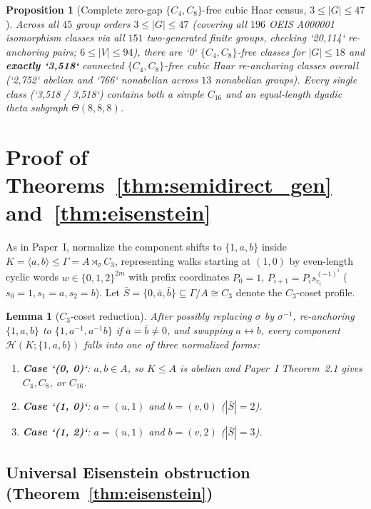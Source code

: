 \documentclass[11pt]{amsart}
\newtheorem{lemma}[theorem]{Lemma}
\newtheorem{proposition}[theorem]{Proposition}
\theoremstyle{definition}
\theoremstyle{remark}
\newcommand{\Haar}{\mathcal{H}}
\begin{document}
\begin{proposition}[Complete zero-gap $\{C_4, C_8\}$-free cubic Haar census, $3 \le |G| \le 47$]\label{prop:census}
Across all $45$ group orders $3 \le |G| \le 47$ (covering all $196$ OEIS A000001 isomorphism classes via all $151$ two-generated finite groups, checking `20,114` re-anchoring pairs; $6 \le |V| \le 94$), there are `0` $\{C_4, C_8\}$-free classes for $|G| \le 18$ and \textbf{exactly `3,518`} connected $\{C_4, C_8\}$-free cubic Haar re-anchoring classes overall (`2,752` abelian and `766` nonabelian across $13$ nonabelian groups). Every single class (`3,518 / 3,518`) contains both a simple $C_{16}$ and an equal-length dyadic theta subgraph $\Theta(8, 8, 8)$.
\end{proposition}

\section{Proof of Theorems~\ref{thm:semidirect_gen} and~\ref{thm:eisenstein}}\label{sec:semidirect}

As in Paper~I, normalize the component shifts to $\{1, a, b\}$ inside $K = \langle a, b \rangle \le \Gamma = A \rtimes_\sigma C_3$, representing walks starting at $(1, 0)$ by even-length cyclic words $w \in \{0,1,2\}^{2m}$ with prefix coordinates $P_0 = 1$, $P_{i+1} = P_i s_{c_i}^{(-1)^i}$ ($s_0=1, s_1=a, s_2=b$). Let $\bar{S} = \{0, \bar{a}, \bar{b}\} \subseteq \Gamma/A \cong C_3$ denote the $C_3$-coset profile.

\begin{lemma}[$C_3$-coset reduction]\label{lem:coset_split}
After possibly replacing $\sigma$ by $\sigma^{-1}$, re-anchoring $\{1,a,b\}$ to $\{1, a^{-1}, a^{-1}b\}$ if $\bar{a} = \bar{b} \ne 0$, and swapping $a \leftrightarrow b$, every component $\Haar(K; \{1,a,b\})$ falls into one of three normalized forms:
\begin{enumerate}[label=(\arabic*)]
\item \textbf{Case `(0, 0)`}: $a, b \in A$, so $K \le A$ is abelian and Paper~I Theorem~2.1 gives $C_4, C_8$, or $C_{16}$.
\item \textbf{Case `(1, 0)`}: $a = (u, 1)$ and $b = (v, 0)$ ($|\bar{S}| = 2$).
\item \textbf{Case `(1, 2)`}: $a = (u, 1)$ and $b = (v, 2)$ ($|\bar{S}| = 3$).
\end{enumerate}
\end{lemma}

\subsection{Universal Eisenstein obstruction (Theorem~\ref{thm:eisenstein})}
\end{document}
